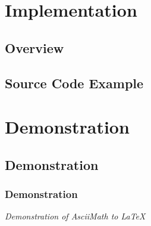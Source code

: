 \documentclass{beamer}
\begin{document}
\section{Implementation}
\subsection{Overview}
\subsection{Source Code Example}

\section{Demonstration}
\subsection{Demonstration}
\begin{frame}
\frametitle{Demonstration}
\begin{center}
\emph{Demonstration of AsciiMath to \LaTeX}
\end{center}
\end{frame}
\end{document}
